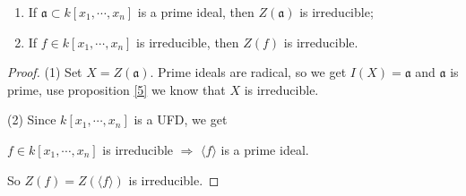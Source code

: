 \begin{corollary}{}
  \noindent
	\begin{enumerate}
		\item If $ \mathfrak{a}\subset k[x_1,\cdots,x_n] $ is a prime ideal, then $ Z(\mathfrak{a}) $ is irreducible;
		\item If $ f\in k[x_1,\cdots,x_n] $ is irreducible, then $ Z(f) $ is irreducible.
	\end{enumerate}
\end{corollary}
\begin{proof}
	(1) Set $ X=Z(\mathfrak{a}) $. Prime ideals are radical, so we get $ I(X)=\mathfrak{a} $ and $ \mathfrak{a} $ is prime, use proposition \ref{5} we know that $ X $ is irreducible.

	(2) Since $ k[x_1,\cdots,x_n] $ is a UFD, we get
	\begin{center}
		$ f\in k[x_1,\cdots,x_n] $ is irreducible $ \Rightarrow $ $ \langle f\rangle $ is a prime ideal.
	\end{center}
	So $ Z(f)=Z(\langle f\rangle) $ is irreducible.
\end{proof}

